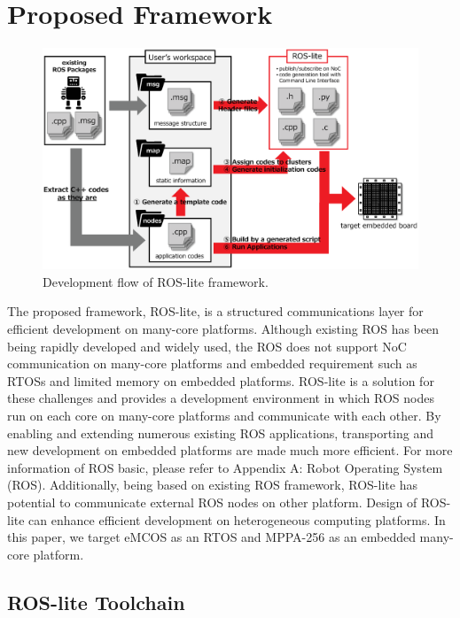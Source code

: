 \chapter{Proposed Framework}
\label{chap:proposed_framework}

\begin{figure}[!htbp]
  \centering
  \includegraphics[width=0.9\linewidth]{../figure/roslite/system_model.eps}
  \caption{\label{fig:rosl_system_model}
    Development flow of ROS-lite framework.}
\end{figure}

The proposed framework, ROS-lite, is a structured communications layer for efficient development on many-core platforms.
Although existing ROS has been being rapidly developed and widely used, the ROS does not support NoC communication on many-core platforms and embedded requirement such as RTOSs and limited memory on embedded platforms.
ROS-lite is a solution for these challenges and provides a development environment in which ROS nodes run on each core on many-core platforms and communicate with each other.
By enabling and extending numerous existing ROS applications, transporting and new development on embedded platforms are made much more efficient.
For more information of ROS basic, please refer to Appendix A: Robot Operating System (ROS).
Additionally, being based on existing ROS framework, ROS-lite has potential to communicate external ROS nodes on other platform.
Design of ROS-lite can enhance efficient development on heterogeneous computing platforms.
In this paper, we target eMCOS as an RTOS and MPPA-256 as an embedded many-core platform.

\section{ROS-lite Toolchain}
\label{sec:toolchain}

